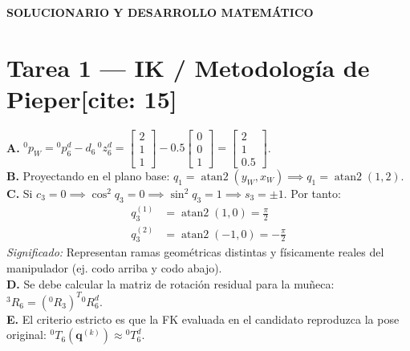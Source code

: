 \documentclass[11pt, a4paper]{article}
\begin{document}
\begin{center}
    \Large\textbf{\textcolor{red!80!black}{SOLUCIONARIO Y DESARROLLO MATEMÁTICO}}\\[0.2cm]
\end{center}

\section*{Tarea 1 — IK / Metodología de Pieper[cite: 15]}
\textbf{A.} ${}^0p_W = {}^0p_6^d - d_6\,{}^0z_6^d = \begin{bmatrix} 2 \\ 1 \\ 1 \end{bmatrix} - 0.5 \begin{bmatrix} 0 \\ 0 \\ 1 \end{bmatrix} = \begin{bmatrix} 2 \\ 1 \\ 0.5 \end{bmatrix}$.\\
\textbf{B.} Proyectando en el plano base: $q_1 = \operatorname{atan2}(y_W, x_W) \implies q_1 = \operatorname{atan2}(1, 2)$.\\
\textbf{C.} Si $c_3 = 0 \implies \cos^2 q_3 = 0 \implies \sin^2 q_3 = 1 \implies s_3 = \pm 1$. Por tanto:
\begin{align*}
    q_3^{(1)} &= \operatorname{atan2}(1, 0) = \frac{\pi}{2} \\
    q_3^{(2)} &= \operatorname{atan2}(-1, 0) = -\frac{\pi}{2}
\end{align*}
\textit{Significado:} Representan ramas geométricas distintas y físicamente reales del manipulador (ej. codo arriba y codo abajo).\\
\textbf{D.} Se debe calcular la matriz de rotación residual para la muñeca: ${}^3R_6 = ({}^0R_3)^T {}^0R_6^d$.\\
\textbf{E.} El criterio estricto es que la FK evaluada en el candidato reproduzca la pose original: ${}^0T_6(\mathbf{q}^{(k)}) \approx {}^0T_6^d$.
\end{document}
